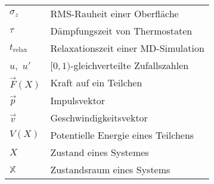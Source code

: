 \begin{tabular}{ll}
$\sigma_z$       & RMS-Rauheit einer Oberfläche                                 \\
$\tau$           & Dämpfungszeit von Thermostaten                               \\
$t_\text{relax}$ & Relaxationszeit einer MD-Simulation                          \\
$u$,~$u'$        & $[0,1)$-gleichverteilte Zufallszahlen                        \\
$\vec F(X)$      & Kraft auf ein Teilchen                                       \\
$\vec p$         & Impulsvektor                                                 \\
$\vec v$         & Geschwindigkeitsvektor                                       \\
$V(X)$           & Potentielle Energie eines Teilchens                          \\
$X$              & Zustand eines Systemes                                       \\
$\mathbb{X}$     & Zustandsraum eines Systems                                   \\
\end{tabular}


\cleardoublepage
{} %
